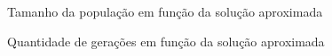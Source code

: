 \documentclass[a4paper, 11pt]{article}
\begin{document}
      \begin{figure}[H]
        \caption{\label{fig:my-label} Tamanho da população em função da solução aproximada}
      \end{figure}
 
      \begin{figure}[H]
        \caption{\label{fig:my-label} Quantidade de gerações em função da solução aproximada}
      \end{figure} 
 
\end{document}
